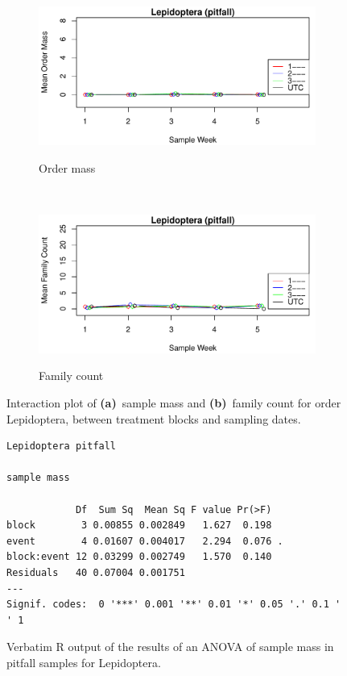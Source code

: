 \documentclass[10pt,letterpaper,twocolumn]{article}
\begin{document}
\begin{figure}[h]
	\centering
	\begin{subfigure}[b]{0.45\textwidth}
		\caption{Order mass}
		\includegraphics[width=\textwidth]{plots/blocks/interaction/mass/mass_pitfall_Lepidoptera_interplot.pdf}
		\label{fig:pitfall_lepidoptera_mass_interplot}
	\end{subfigure}
	~
	\begin{subfigure}[b]{0.45\textwidth}
		\caption{Family count}
		\includegraphics[width=\textwidth]{plots/blocks/interaction/family/family_pitfall_Lepidoptera_interplot.pdf}
		\label{fig:pitfall_lepidoptera_family_interplot}
	\end{subfigure}
	\caption{Interaction plot of \textbf{(a)}~sample mass and \textbf{(b)}~family count for order Lepidoptera, between treatment blocks and sampling dates.}
	\label{fig:pitfall_lepidoptera_interplot}
	\smallskip
	\nointerlineskip
	\hrulefill
\end{figure}

\begin{figure}[h]
	\lstset{numbers=left}
	\lstset{xleftmargin=5mm,framexleftmargin=5mm}
	\begin{lstlisting}
Lepidoptera pitfall 

sample mass 

            Df  Sum Sq  Mean Sq F value Pr(>F)  
block        3 0.00855 0.002849   1.627  0.198  
event        4 0.01607 0.004017   2.294  0.076 .
block:event 12 0.03299 0.002749   1.570  0.140  
Residuals   40 0.07004 0.001751                 
---
Signif. codes:  0 '***' 0.001 '**' 0.01 '*' 0.05 '.' 0.1 ' ' 1
	\end{lstlisting}
	\caption{Verbatim R output of the results of an ANOVA of sample mass in pitfall samples for Lepidoptera.}
	\label{fig:pitfall_lepidoptera_mass_anova}
	\smallskip
	\nointerlineskip
	\hrulefill
\end{figure}
\end{document}
